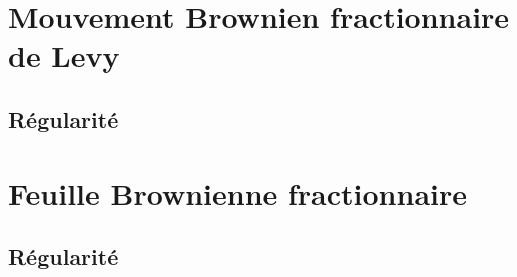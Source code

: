 
\section{Mouvement Brownien fractionnaire de Levy}
\subsection{Régularité}
\section{Feuille Brownienne fractionnaire}
\subsection{Régularité}